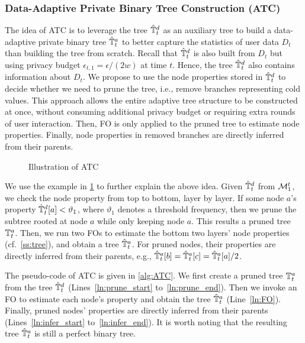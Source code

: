 \subsubsection{Data-Adaptive Private Binary Tree Construction (ATC)}

The idea of ATC is to leverage the tree $\hat{\mathbb{T}}^d_t$ as an auxiliary tree to build a
data-adaptive private binary tree $\hat{\mathbb{T}}^a_t$ to better capture the statistics of
user data $D_t$ than building the tree from scratch.
Recall that $\hat{\mathbb{T}}^d_t$ is also built from $D_t$ but using privacy budget
$\epsilon_{t,1} = \epsilon/(2w)$ at time $t$.
Hence, the tree $\hat{\mathbb{T}}^d_t$ also contains information about $D_t$.
We propose to use the node properties stored in $\hat{\mathbb{T}}^d_t$ to decide whether we
need to prune the tree, i.e., remove branches representing cold values.
This approach allows the entire adaptive tree structure to be constructed at once, without consuming additional privacy budget or requiring extra rounds of user interaction.
Then, FO is only applied to the pruned tree to estimate node properties.
Finally, node properties in removed branches are directly inferred from their
parents.

\begin{figure}[htp]
  \centering
  
  \caption{Illustration of ATC}
  \label{fig:ATC}
\end{figure}

We use the example in \cref{fig:ATC} to further explain the above idea.
Given $\hat{\mathbb{T}}^d_t$ from $\mathcal{M}_1^t$, we check the node property from top to bottom,
layer by layer.
If some node $a$'s property $\hat{\mathbb{T}}^d_t[a]<\vartheta_1$, where $\vartheta_1$ denotes
a threshold frequency, then we prune the subtree rooted at node $a$ while only
keeping node $a$.
This results a pruned tree $\mathbb{T}^a_t$.
Then, we run two FOs to estimate the bottom two layers' node properties
(cf.~\cref{ss:tree}), and obtain a tree $\hat{\mathbb{T}}^a_t$.
For pruned nodes, their properties are directly inferred from their parents,
e.g., $\hat{\mathbb{T}}^a_t[b]=\hat{\mathbb{T}}^a_t[c]=\hat{\mathbb{T}}^a_t[a]/2$.

The pseudo-code of ATC is given in \cref{alg:ATC}.
We first create a pruned tree $\mathbb{T}^a_t$ from the tree $\hat{\mathbb{T}}^d_t$
(Lines~\ref{ln:prune_start} to~\ref{ln:prune_end}).
Then we invoke an FO to estimate each node's property and obtain the tree $\hat{\mathbb{T}}^a_t$
(Line~\ref{ln:FO}).
Finally, pruned nodes' properties are directly inferred from their parents
(Lines~\ref{ln:infer_start} to~\ref{ln:infer_end}).
It is worth noting that the resulting tree $\hat{\mathbb{T}}^a_t$ is still a perfect
binary tree.

